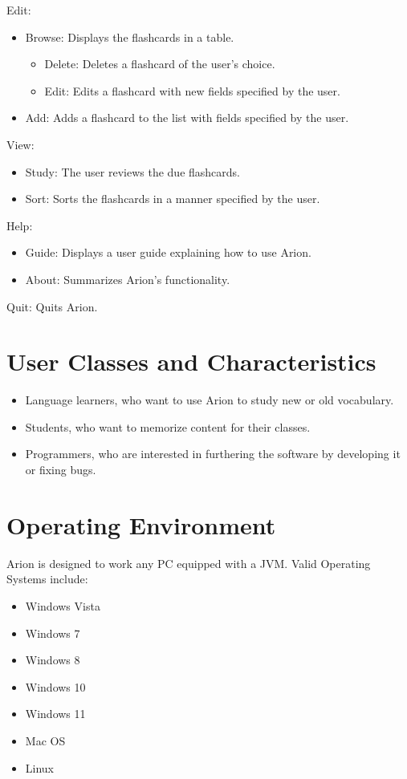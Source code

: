 \documentclass{scrreprt}
\begin{document}
Edit:
\begin{itemize}
    \item Browse: Displays the flashcards in a table.
    \begin{itemize}
        \item Delete: Deletes a flashcard of the user's choice.
        \item Edit: Edits a flashcard with new fields specified by the user.
    \end{itemize}
    \item Add: Adds a flashcard to the list with fields specified by the user.
\end{itemize}

View:
\begin{itemize}
    \item Study: The user reviews the due flashcards.
    \item Sort: Sorts the flashcards in a manner specified by the user.
\end{itemize}

Help:
\begin{itemize}
    \item Guide: Displays a user guide explaining how to use Arion.
    \item About: Summarizes Arion's functionality.
\end{itemize}

Quit: Quits Arion.

\section{User Classes and Characteristics}
\begin{itemize}
    \item Language learners, who want to use Arion to study new or old vocabulary.
    \item Students, who want to memorize content for their classes.
    \item Programmers, who are interested in furthering the software by developing it or fixing bugs.
\end{itemize}

\section{Operating Environment}

\begin{flushleft} %
    Arion is designed to work any PC equipped with a JVM. Valid Operating Systems include:
    \begin{itemize}
        \item Windows Vista
        \item Windows 7
        \item Windows 8
        \item Windows 10
        \item Windows 11
        \item Mac OS
        \item Linux
    \end{itemize}
\end{flushleft}
\end{document}

